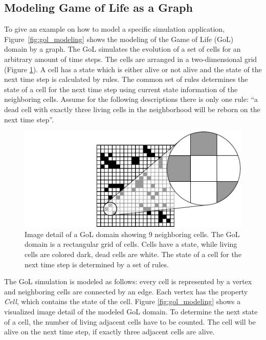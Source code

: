 \subsection{Modeling Game of Life as a Graph}
\label{sec:gol}
To give an example on how to model a specific simulation application,
Figure~\ref{fig:gol_modeling} shows the modeling of the Game of Life
(GoL)~\cite{ref:gol} domain by a graph. The GoL simulates the
evolution of a set of cells for an arbitrary amount of time steps. The
cells are arranged in a two-dimensional grid (Figure
\ref{fig:gol_simulation}).  A cell has a state which is either alive
or not alive and the state of the next time step is calculated by
rules.  The common set of rules determines the state of a cell for the
next time step using current state information of the neighboring
cells.  Assume for the following descriptions there is only one rule:
``a dead cell with exactly three living cells in the neighborhood will
be reborn on the next time step''.


\begin{figure}[H]
  \centering \includegraphics[width=\textwidth]{graphics/30_gol_simulation}
  \caption{Image detail of a GoL domain showing 9 neighboring cells. The GoL
    domain is a rectangular grid of cells.  Cells have a state, while
    living cells are colored dark, dead cells are white. The state of
    a cell for the next time step is determined by a set of rules.}
  \label{fig:gol_simulation}
\end{figure}

\noindent The GoL simulation is modeled as follows:
every cell is represented by a vertex and neighboring cells are
connected by an edge.  Each vertex has the property \emph{Cell}, which
contains the state of the cell. Figure \ref{fig:gol_modeling} shows a
visualized image detail of the modeled GoL domain. To determine the next
state of a cell, the number of living adjacent cells have to be counted. The cell
will be alive on the next time step, if exactly three adjacent cells
are alive.


